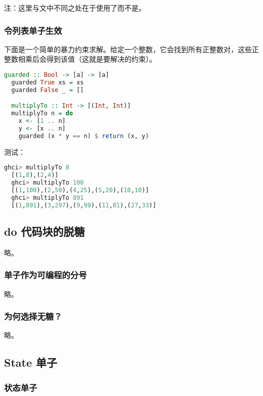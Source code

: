 \documentclass[./main.tex]{subfiles}
\begin{document}
注：这里与文中不同之处在于使用了而不是。

\subsubsection*{令列表单子生效}

下面是一个简单的暴力约束求解。给定一个整数，它会找到所有正整数对，这些正整数相乘后会得到该值（这就是要解决的约束）。

\begin{lstlisting}[language=Haskell]
  guarded :: Bool -> [a] -> [a]
  guarded True xs = xs
  guarded False _ = []

  multiplyTo :: Int -> [(Int, Int)]
  multiplyTo n = do
    x <- [1 .. n]
    y <- [x .. n]
    guarded (x * y == n) $ return (x, y)
\end{lstlisting}

测试：

\begin{lstlisting}[language=Haskell]
  ghci> multiplyTo 8
  [(1,8),(2,4)]
  ghci> multiplyTo 100
  [(1,100),(2,50),(4,25),(5,20),(10,10)]
  ghci> multiplyTo 891
  [(1,891),(3,297),(9,99),(11,81),(27,33)]
\end{lstlisting}

\subsection*{do 代码块的脱糖}

略。

\subsubsection*{单子作为可编程的分号}

略。

\subsubsection*{为何选择无糖？}

略。

\subsection*{State 单子}


\subsubsection*{状态单子}
\end{document}
